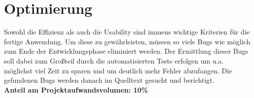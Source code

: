 \section{Optimierung}
Sowohl die Effizienz als auch die Usability sind immens wichtige Kriterien für die fertige Anwendung. Um diese zu gewährleisten, müssen so viele Bugs wie möglich zum Ende der Entwicklungsphase eliminiert werden. Der Ermittlung dieser Bugs soll dabei zum Großteil durch die automatisierten Tests erfolgen um u.a. möglichst viel Zeit zu sparen und um deutlich mehr Fehler abzufangen. Die gefundenen Bugs werden danach im Quelltext gesucht und berichtigt. \\
\textbf{Anteil am Projektaufwandsvolumen: 10\%}
